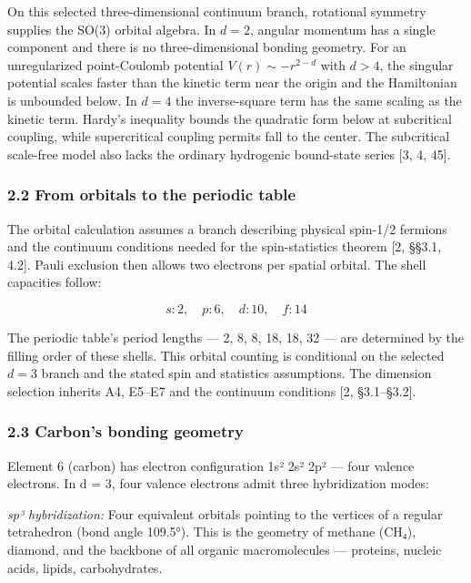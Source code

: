 \documentclass[
]{article}
\begin{document}
On this selected three-dimensional continuum branch, rotational symmetry
supplies the SO(3) orbital algebra. In \(d=2\), angular momentum has a
single component and there is no three-dimensional bonding geometry. For
an unregularized point-Coulomb potential \(V(r)\sim-r^{2-d}\) with
\(d>4\), the singular potential scales faster than the kinetic term near
the origin and the Hamiltonian is unbounded below. In \(d=4\) the
inverse-square term has the same scaling as the kinetic term. Hardy's
inequality bounds the quadratic form below at subcritical coupling,
while supercritical coupling permits fall to the center. The subcritical
scale-free model also lacks the ordinary hydrogenic bound-state series
{[}3, 4, 45{]}.

\hypertarget{from-orbitals-to-the-periodic-table}{%
\subsubsection{2.2 From orbitals to the periodic
table}\label{from-orbitals-to-the-periodic-table}}

The orbital calculation assumes a branch describing physical spin-1/2
fermions and the continuum conditions needed for the spin-statistics
theorem {[}2, §§3.1, 4.2{]}. Pauli exclusion then allows two electrons
per spatial orbital. The shell capacities follow:

\[s: 2, \quad p: 6, \quad d: 10, \quad f: 14\]

The periodic table's period lengths --- 2, 8, 8, 18, 18, 32 --- are
determined by the filling order of these shells. This orbital counting
is conditional on the selected \(d = 3\) branch and the stated spin and
statistics assumptions. The dimension selection inherits A4, E5--E7 and
the continuum conditions {[}2, §3.1--§3.2{]}.

\hypertarget{carbons-bonding-geometry}{%
\subsubsection{2.3 Carbon's bonding
geometry}\label{carbons-bonding-geometry}}

Element 6 (carbon) has electron configuration 1s² 2s² 2p² --- four
valence electrons. In d = 3, four valence electrons admit three
hybridization modes:

\emph{sp³ hybridization:} Four equivalent orbitals pointing to the
vertices of a regular tetrahedron (bond angle 109.5°). This is the
geometry of methane (CH₄), diamond, and the backbone of all organic
macromolecules --- proteins, nucleic acids, lipids, carbohydrates.
\end{document}
